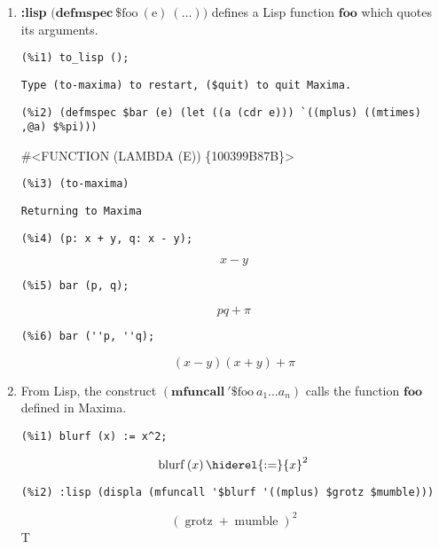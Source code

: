 \documentclass[12pt,leqno]{article}
\begin{document}
\begin{enumerate}
\item {\bf :lisp} $\mathrm{(}\mathbf{defmspec\ } \mathrm{\$foo\ (e)\ (\ldots))}$
defines a Lisp function $\mathbf{foo}$ which quotes its arguments.
\begin{verbatim}
(%i1) to_lisp ();
\end{verbatim}
\begin{Verbatim}
Type (to-maxima) to restart, ($quit) to quit Maxima.
\end{Verbatim}
\begin{verbatim}
(%i2) (defmspec $bar (e) (let ((a (cdr e))) `((mplus) ((mtimes) ,@a) $%pi)))
\end{verbatim}
\#\textless FUNCTION (LAMBDA (E)) \{100399B87B\}\textgreater 
\begin{verbatim}
(%i3) (to-maxima)
\end{verbatim}
\begin{Verbatim}
Returning to Maxima
\end{Verbatim}
\begin{verbatim}
(%i4) (p: x + y, q: x - y);
\end{verbatim}
\begin{dmath}[number={\(\mathop{\mathrm{\%o}_{2}}\)}]
x-y
\end{dmath}
\begin{verbatim}
(%i5) bar (p, q);
\end{verbatim}
\begin{dmath}[number={\(\mathop{\mathrm{\%o}_{3}}\)}]
p q+\pi
\end{dmath}
\begin{verbatim}
(%i6) bar (''p, ''q);
\end{verbatim}
\begin{dmath}[number={\(\mathop{\mathrm{\%o}_{4}}\)}]
\left(x-y\right) \left(x+y\right)+\pi
\end{dmath}


\item From Lisp, the construct $(\mathbf{mfuncall\ '\$}\mathrm{foo\ }a_1 \ldots a_n)$
calls the function $\mathbf{foo}$ defined in Maxima.

\begin{verbatim}
(%i1) blurf (x) := x^2;
\end{verbatim}
\begin{dmath}[number={\(\mathop{\mathrm{\%o}_{1}}\)}]
\mathop{\mathrm{blurf}}\left(x\right) \hiderel{:=} {x}^{2}
\end{dmath}
\begin{verbatim}
(%i2) :lisp (displa (mfuncall '$blurf '((mplus) $grotz $mumble)))
\end{verbatim}
\begin{dmath*}
{\left(\mathop{\mathrm{grotz}}+\mathop{\mathrm{mumble}}\right)}^{2}
\end{dmath*}
T

\end{enumerate}
\end{document}
